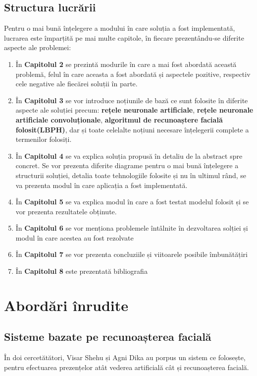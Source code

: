 \documentclass[a4paper, 12pt]{article}
\begin{document}
	\subsection{Structura lucrării}
	\bigskip
	\quad\space Pentru o mai bună înțelegere a modului în care soluția a fost implementată, lucrarea este împarțită pe mai multe capitole, în fiecare prezentându-se diferite aspecte ale problemei:
	\begin{enumerate}[I]
		\item În \textbf{Capitolul 2} se prezintă modurile în care a mai fost abordată această problemă, felul în care aceasta a fost abordată și aspectele pozitive, respectiv cele negative ale fiecărei soluții în parte.
		\item În \textbf{Capitolul 3} se vor introduce noțiunile de bază ce sunt folosite în diferite aspecte ale soluției precum: \textbf{rețele neuronale artificiale}, \textbf{rețele neuronale artificiale convoluționale}, \textbf{algoritmul de recunoaștere facială folosit(LBPH)}, dar și toate celelalte noțiuni necesare înțelegerii complete a termenilor folosiți.
		\item În \textbf{Capitolul 4} se va explica soluția propusă în detaliu de la abstract spre concret. Se vor prezenta diferite diagrame pentru o mai bună înțelegere a structurii soluției, detalia toate tehnologiile folosite și nu în ultimul rând, se va prezenta modul în care aplicația a fost implementată.
		\item În \textbf{Capitolul 5} se va explica modul în care a fost testat modelul folosit și se vor prezenta rezultatele obținute.
		\item În \textbf{Capitolul 6} se vor menționa problemele întâlnite în dezvoltarea solției și modul în care acestea au fost rezolvate
		\item În \textbf{Capitolul 7} se vor prezenta concluziile și viitoarele posibile îmbunătățiri
		\item În \textbf{Capitolul 8} este prezentată bibliografia
	\end{enumerate}
	
	
	\newpage
	\section{Abordări înrudite}
	\bigskip
	\bigskip
	\subsection {Sisteme bazate pe recunoașterea facială}
	\bigskip
	\quad\space În \textbf{\cite{shehu2010using}} doi cercetătători, Visar Shehu și Agni Dika au porpus un    sistem ce folosește, pentru efectuarea prezențelor atât vederea artificială cât și recunoașterea facială.
	
\end{document}

